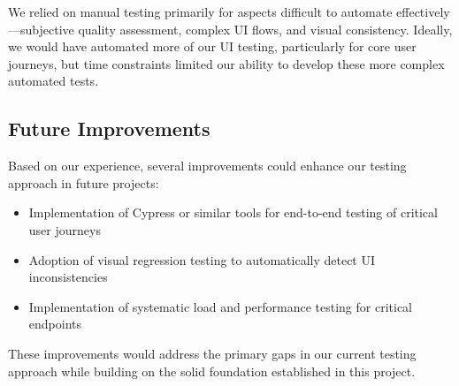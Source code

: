 We relied on manual testing primarily for aspects difficult to automate effectively—subjective quality assessment, complex UI flows, and visual consistency. Ideally, we would have automated more of our UI testing, particularly for core user journeys, but time constraints limited our ability to develop these more complex automated tests.

\subsection{Future Improvements}

Based on our experience, several improvements could enhance our testing approach in future projects:

\begin{itemize}
    \item Implementation of Cypress or similar tools for end-to-end testing of critical user journeys
    \item Adoption of visual regression testing to automatically detect UI inconsistencies
    \item Implementation of systematic load and performance testing for critical endpoints
\end{itemize}

These improvements would address the primary gaps in our current testing approach while building on the solid foundation established in this project.